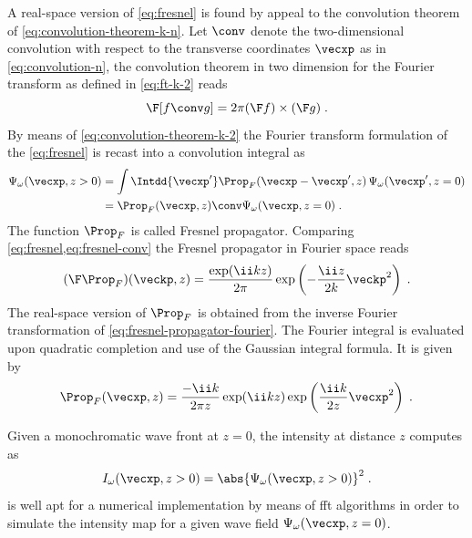 \documentclass[
twoside,
openright,
titlepage,
numbers=noenddot,
headinclude,
fleqn,
a4paper,
footinclude=true,
cleardoublepage=empty,
abstractoff,
BCOR=5mm,
paper=a4,
fontsize=11pt,
british,ngerman,american,
]{scrreprt}
\begin{document}
A real-space version of \cref{eq:fresnel} is found by appeal to the
convolution theorem of \cref{eq:convolution-theorem-k-n}.  Let $\conv$
denote the two-dimensional convolution with respect to the transverse
coordinates $\vecxp$ as in \cref{eq:convolution-n}, the convolution
theorem in two dimension for the Fourier transform as defined in
\cref{eq:ft-k-2} reads
\begin{equation}
  \label{eq:convolution-theorem-k-2}
  \F[f \conv g] = 2\pi (\F f) \times (\F g) \;.
\end{equation}
By means of \cref{eq:convolution-theorem-k-2} the Fourier transform
formulation of the \cref{eq:fresnel} is recast into a convolution
integral as
\begin{equation}
  \label{eq:fresnel-conv}
  \begin{split}
      \Psi_{\omega}(\vecxp,z>0) 
       &= \int\Intdd{\vecxp'}
       \Prop_F(\vecxp-\vecxp',z)\,\Psi_{\omega}(\vecxp',z=0)
    \\ &= \Prop_F(\vecxp,z)\conv\Psi_{\omega}(\vecxp,z=0)\;.
  \end{split}
\end{equation}
The function $\Prop_F$ is called  Fresnel propagator.  Comparing
\cref{eq:fresnel,eq:fresnel-conv} the Fresnel propagator in Fourier
space reads 
\begin{equation}
  \label{eq:fresnel-propagator-fourier}
  (\F\Prop_F)(\veckp,z) = 
  \frac{\exp(\ii k z)}{2\pi}\exp\left(-\frac{\ii z}{2k}\veckp^2\right) \;.
\end{equation}
The real-space version of $\Prop_F$ is obtained from the inverse
Fourier transformation of \cref{eq:fresnel-propagator-fourier}.  The
Fourier integral is evaluated upon quadratic completion and use of the
Gaussian integral formula.  It is given by
\begin{equation}
  \label{eq:fresnel-propagator}
  \Prop_F(\vecxp,z) = 
  \frac{-\ii k}{2\pi z} \exp(\ii k z) 
  \exp\left(\frac{\ii k}{2z}\vecxp^2\right) \;.
\end{equation}

Given a monochromatic wave front at $z=0$, the intensity at distance
$z$ computes as
\begin{equation}
  \label{eq:intensity-scalar}
  I_\omega(\vecxp,z>0) = \abs{\Psi_{\omega}(\vecxp,z>0)}^2 \;.
\end{equation}
 is well apt for a numerical implementation by means
of \ac{fft} algorithms in order to simulate the intensity map for a
given wave field $\Psi_{\omega}(\vecxp,z=0)$.
\end{document}
